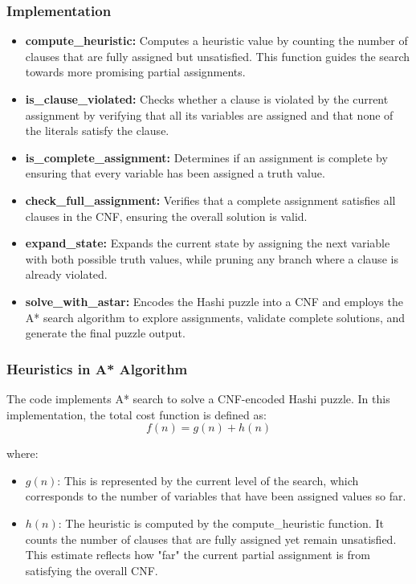 \subsubsection{Implementation}
\begin{itemize}
    \item \textbf{compute\_heuristic:} Computes a heuristic value by counting the number of clauses that are fully assigned but unsatisfied. This function guides the search towards more promising partial assignments.
    \item \textbf{is\_clause\_violated:} Checks whether a clause is violated by the current assignment by verifying that all its variables are assigned and that none of the literals satisfy the clause.
    \item \textbf{is\_complete\_assignment:} Determines if an assignment is complete by ensuring that every variable has been assigned a truth value.
    \item \textbf{check\_full\_assignment:} Verifies that a complete assignment satisfies all clauses in the CNF, ensuring the overall solution is valid.
    \item \textbf{expand\_state:} Expands the current state by assigning the next variable with both possible truth values, while pruning any branch where a clause is already violated.
    \item \textbf{solve\_with\_astar:} Encodes the Hashi puzzle into a CNF and employs the A* search algorithm to explore assignments, validate complete solutions, and generate the final puzzle output.
\end{itemize}


\subsubsection{Heuristics in A* Algorithm}
The code implements A* search to solve a CNF-encoded Hashi puzzle. In this implementation, the total cost function is defined as:
\[
    f(n) = g(n) + h(n)
\]

where:
\begin{itemize}
    \item \( g(n) \): This is represented by the current level of the search, which corresponds to the number of variables that have been assigned values so far.

    \item \( h(n) \): The heuristic is computed by the compute\_heuristic function. It counts the number of clauses that are fully assigned yet remain unsatisfied. This estimate reflects how "far" the current partial assignment is from satisfying the overall CNF.
\end{itemize}


